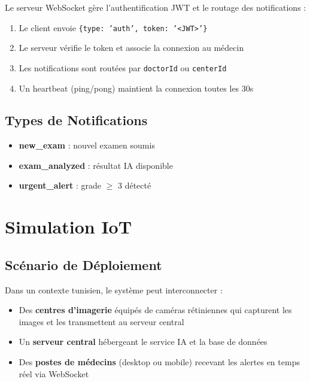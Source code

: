 \documentclass[12pt,a4paper,oneside]{report}
\begin{document}
Le serveur WebSocket gère l'authentification JWT et le routage des
notifications :

\begin{enumerate}
    \item Le client envoie \texttt{\{type: 'auth', token: '<JWT>'\}}
    \item Le serveur vérifie le token et associe la connexion au médecin
    \item Les notifications sont routées par \texttt{doctorId} ou \texttt{centerId}
    \item Un heartbeat (ping/pong) maintient la connexion toutes les 30s
\end{enumerate}

\subsection{Types de Notifications}

\begin{itemize}
    \item \textbf{new\_exam} : nouvel examen soumis
    \item \textbf{exam\_analyzed} : résultat IA disponible
    \item \textbf{urgent\_alert} : grade $\geq$ 3 détecté
\end{itemize}

\section{Simulation IoT}

\subsection{Scénario de Déploiement}

Dans un contexte tunisien, le système peut interconnecter :

\begin{itemize}
    \item Des \textbf{centres d'imagerie} équipés de caméras rétiniennes
          qui capturent les images et les transmettent au serveur central
    \item Un \textbf{serveur central} hébergeant le service IA et la
          base de données
    \item Des \textbf{postes de médecins} (desktop ou mobile) recevant
          les alertes en temps réel via WebSocket
\end{itemize}
\end{document}
